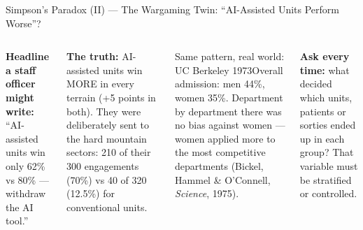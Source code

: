 \documentclass[aspectratio=169,10pt,t]{beamer}
\begin{document}
\begin{frame}{Simpson's Paradox (II) --- The Wargaming Twin: ``AI-Assisted Units Perform Worse''?}
\begin{columns}[T]
\begin{wbox}\scriptsize\textbf{Headline a staff officer might write:} ``AI-assisted units win only 62\% vs 80\% --- withdraw the AI tool.''\end{wbox}
\begin{rbox}\scriptsize\textbf{The truth:} AI-assisted units win MORE in every terrain (+5 points in both). They were deliberately sent to the hard mountain sectors: 210 of their 300 engagements (70\%) vs 40 of 320 (12.5\%) for conventional units.\end{rbox}
\begin{cbox}[ISSAnavy]{Same pattern, real world: UC Berkeley 1973}\scriptsize Overall admission: men 44\%, women 35\%. Department by department there was no bias against women --- women applied more to the most competitive departments (Bickel, Hammel \& O'Connell, \textit{Science}, 1975).\end{cbox}
\begin{ibox}\scriptsize\textbf{Ask every time:} what decided which units, patients or sorties ended up in each group? That variable must be stratified or controlled.\end{ibox}
\end{columns}
\end{frame}
\end{document}
